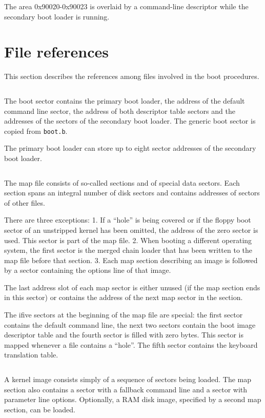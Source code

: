 \documentclass[fullpage]{article}
\begin{document}
The area 0x90020-0x90023 is overlaid by a command-line descriptor while
the secondary boot loader is running.



\section{File references}

This section describes the references among files involved in the boot
procedures.

$$
  
$$

The boot sector contains the primary boot loader, the address of the default
command line sector, the address of both
descriptor table sectors and the addresses of the sectors of the secondary
boot loader. The generic boot sector is copied from {\tt boot.b}.

The primary boot loader can store up to eight sector addresses of the
secondary boot loader.

$$
  
$$

The map file consists of so-called sections and of special data sectors.
Each section
spans an integral number of disk sectors and contains addresses of sectors
of other files.

There are three exceptions: 1. If a ``hole'' is being
covered or if the floppy boot sector of an unstripped kernel has been omitted,
the address of the zero sector is used. This sector is part of the
map file. 2. When booting a different operating system, the first sector is
the merged chain loader that has been written to the map file before that
section. 3. Each map section describing an image is followed by a sector
containing the options line of that image.

The last address slot of each map sector is either unused (if the map section
ends in this sector) or contains the address of the next map sector in the
section.

The ifive sectors at the beginning of the map file are special: the first
sector contains the default command line, the next
two sectors contain the boot image descriptor table and the fourth sector
is filled with zero bytes. This sector is mapped whenever a file contains
a ``hole''. The fifth sector contains the keyboard translation table.

$$
  
$$

A kernel image consists simply of a sequence of sectors being
loaded. The map section also contains a sector with a fallback command line
and a sector with parameter line options. Optionally, a RAM disk image,
specified by a second map section, can be loaded.
\end{document}
